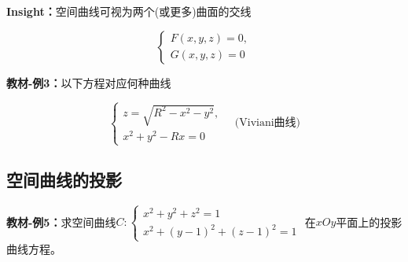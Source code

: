{\bf Insight：}空间曲线可视为两个(或更多)曲面的交线

$${\left\{\begin{array}{l}
	F(x,y,z)=0,\\ G(x,y,z)=0
\end{array}\right.}$$

{\bf 教材-例3：}以下方程对应何种曲线

$$\left\{\begin{array}{l}
	z=\sqrt{R^2-x^2-y^2},\\ x^2+y^2-Rx=0
\end{array}\right. \quad{\mbox{(Viviani曲线)}}$$

\begin{center}
\end{center}

\subsection{空间曲线的投影}

{\bf 教材-例5：}求空间曲线$C:\left\{\begin{array}{l}
	x^2+y^2+z^2=1\\ x^2+(y-1)^2+(z-1)^2=1
\end{array}\right.$
在$xOy$平面上的投影曲线方程。

